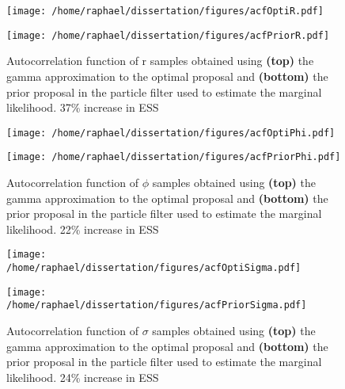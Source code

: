 \documentclass{article}
\begin{document}
	\begin{figure}[htb]
		\centering
		\begin{minipage}{0.9\textwidth}
			\centering
			\texttt{[image: /home/raphael/dissertation/figures/acfOptiR.pdf]}
		\end{minipage}
		\begin{minipage}{0.9\textwidth}
			\centering
			\texttt{[image: /home/raphael/dissertation/figures/acfPriorR.pdf]}
		\end{minipage}
		\caption{Autocorrelation function of r samples obtained using \textbf{(top)} the gamma approximation to the optimal proposal and \textbf{(bottom)} the prior proposal in the particle filter used to estimate the marginal likelihood. 37\% increase in ESS}
		\label{fig:acfR}
	\end{figure}

	\begin{figure}[htb]
		\centering
		\begin{minipage}{0.9\textwidth}
			\centering
			\texttt{[image: /home/raphael/dissertation/figures/acfOptiPhi.pdf]}
		\end{minipage}
		\begin{minipage}{0.9\textwidth}
			\centering
			\texttt{[image: /home/raphael/dissertation/figures/acfPriorPhi.pdf]}
		\end{minipage}
		\caption{Autocorrelation function of $\phi$ samples obtained using \textbf{(top)} the gamma approximation to the optimal proposal and \textbf{(bottom)} the prior proposal in the particle filter used to estimate the marginal likelihood. 22\% increase in ESS}
		\label{fig:acfPhi}
	\end{figure}
	
	\begin{figure}[htb]
		\centering
		\begin{minipage}{0.9\textwidth}
			\centering
			\texttt{[image: /home/raphael/dissertation/figures/acfOptiSigma.pdf]}
		\end{minipage}
		\begin{minipage}{0.9\textwidth}
			\centering
			\texttt{[image: /home/raphael/dissertation/figures/acfPriorSigma.pdf]}
		\end{minipage}
		\caption{Autocorrelation function of $\sigma$ samples obtained using \textbf{(top)} the gamma approximation to the optimal proposal and \textbf{(bottom)} the prior proposal in the particle filter used to estimate the marginal likelihood. 24\% increase in ESS}
		\label{fig:acfSigma}
	\end{figure}
\end{document}
